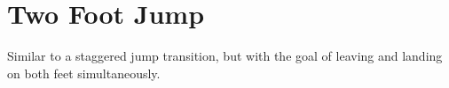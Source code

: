 \section{Two Foot Jump}
\label{sec:transitions/jump_double}

Similar to a staggered jump transition, but with the goal of leaving and landing on both feet simultaneously.  


